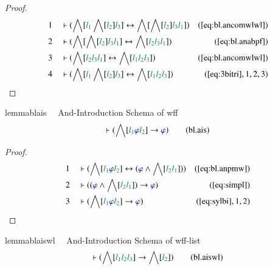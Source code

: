 \begin{proof}
\begin{align}
  1 &&  & \vdash ( \bigwedge[ \mwl{l_1} \bigwedge[ \mwl{l_2} ] \mwl{l_3} ]
      \leftrightarrow \bigwedge[ \bigwedge[ \mwl{l_2} ]
      \mwl{l_3} \mwl{l_1} ]
      )&(\mbox{\ref{eq:bl.ancomwlwl}})\notag
  \\ 2 &&  & \vdash ( \bigwedge[ \bigwedge[ \mwl{l_2} ] \mwl{l_3} \mwl{l_1} ]
      \leftrightarrow \bigwedge[ \mwl{l_2} \mwl{l_3}
      \mwl{l_1} ] )&(\mbox{\ref{eq:bl.anabpf}})\notag
  \\ 3 &&  & \vdash ( \bigwedge[ \mwl{l_2} \mwl{l_3} \mwl{l_1} ]
      \leftrightarrow \bigwedge[ \mwl{l_1} \mwl{l_2}
      \mwl{l_3} ] )&(\mbox{\ref{eq:bl.ancomwlwl}})\notag
  \\ 4 &&  & \vdash ( \bigwedge[ \mwl{l_1} \bigwedge[ \mwl{l_2} ] \mwl{l_3} ]
      \leftrightarrow \bigwedge[ \mwl{l_1} \mwl{l_2}
      \mwl{l_3} ] )&(\mbox{\ref{eq:3bitri}},1,2,3)\notag
\end{align}
\end{proof}

\begin{restatable}{lemma}{blais}~~ And-Introduction Schema of wff
\begin{align}
\vdash ( \bigwedge[ \mwl{l_1} \mw{\varphi} \mwl{l_2} ] \rightarrow \mw{\varphi}
    )\label{eq:bl.ais}\tag{bl.ais}
\end{align}
\end{restatable}

\begin{proof}
\begin{align}
  1 &&  & \vdash ( \bigwedge[ \mwl{l_1} \mw{\varphi} \mwl{l_2} ]
      \leftrightarrow ( \mw{\varphi} \wedge \bigwedge[
      \mwl{l_2} \mwl{l_1} ] )
      )&(\mbox{\ref{eq:bl.anpmw}})\notag
  \\ 2 &&  & \vdash ( ( \mw{\varphi} \wedge \bigwedge[ \mwl{l_2} \mwl{l_1} ] )
      \rightarrow \mw{\varphi}
      )&(\mbox{\ref{eq:simpl}})\notag
  \\ 3 &&  & \vdash ( \bigwedge[ \mwl{l_1} \mw{\varphi} \mwl{l_2} ] \rightarrow
      \mw{\varphi} )&(\mbox{\ref{eq:sylbi}},1,2)\notag
\end{align}
\end{proof}

\begin{restatable}{lemma}{blaiswl}~~ And-Introduction Schema of wff-list
\begin{align}
\vdash ( \bigwedge[ \mwl{l_1} \mwl{l_2} \mwl{l_3} ] \rightarrow \bigwedge[
    \mwl{l_2} ] )\label{eq:bl.aiswl}\tag{bl.aiswl}
\end{align}
\end{restatable}

